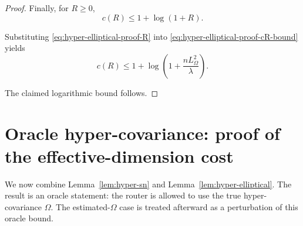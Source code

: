 \documentclass{article} %
\begin{document}
\begin{proof}
Finally, for \(R\ge0\),
\begin{equation}
\label{eq:hyper-elliptical-proof-cR-bound}
c(R)
\le
1+\log(1+R).
\end{equation}

Substituting \eqref{eq:hyper-elliptical-proof-R} into \eqref{eq:hyper-elliptical-proof-cR-bound} yields
\begin{equation}
\label{eq:hyper-elliptical-proof-logT}
c(R)
\le
1+\log\!\left(1+\frac{nL_{\Omega}^2}{\lambda}\right).
\end{equation}

The claimed logarithmic bound follows.
\end{proof}

\section{Oracle hyper-covariance: proof of the effective-dimension cost}
\label{sec:theory-oracle-hyper}

We now combine Lemma~\ref{lem:hyper-sn} and Lemma~\ref{lem:hyper-elliptical}.  The result is an oracle statement: the router is allowed to use the true hyper-covariance \(\Omega\).  The estimated-\(\Omega\) case is treated afterward as a perturbation of this oracle bound.
\end{document}
